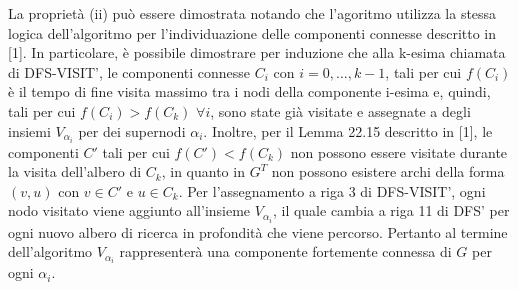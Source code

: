     La propriet\`a (ii) pu\`o essere dimostrata notando che l'agoritmo utilizza la stessa logica dell'algoritmo per
    l'individuazione delle componenti connesse descritto in [1].
    In particolare, \`e possibile dimostrare per induzione che alla k-esima chiamata di DFS-VISIT', le componenti
    connesse $C_i$ con $ i = 0,\ldots, k-1$, tali per cui $f(C_i)$ \`e il tempo di fine visita massimo tra i nodi della
    componente i-esima e, quindi, tali per cui $f(C_i) > f(C_k)$ $\forall i$, sono state gi\`a visitate e assegnate a
    degli insiemi $V_{\alpha_i}$ per dei supernodi $\alpha_i$.
    Inoltre, per il Lemma 22.15 descritto in [1], le componenti $C'$ tali per cui $f(C') < f(C_k)$ non possono essere
    visitate durante la visita dell'albero di $C_k$, in quanto in $G^T$ non possono esistere archi della forma $(v ,u)$
    con $v \in C' $ e $ u \in C_k$.
    Per l'assegnamento a riga 3 di DFS-VISIT', ogni nodo visitato viene aggiunto all'insieme $V_{\alpha_i}$, il quale cambia
    a riga 11 di DFS' per ogni nuovo albero di ricerca in profondit\`a che viene percorso.
    Pertanto al termine dell'algoritmo $V_{\alpha_i}$ rappresenter\`a una componente fortemente connessa di $G$ per ogni $\alpha_i$.
